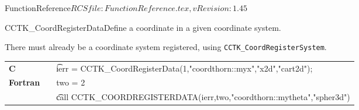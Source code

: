 \begin{cactuspart}{5}{FunctionReference}{$RCSfile: FunctionReference.tex,v $}{$Revision: 1.45 $}
\begin{CCTKFunc}{CCTK\_CoordRegisterData}{Define a coordinate in a given coordinate
system.}
\label{CCTK-CoordRegisterData}
\showargs
\begin{params}
\end{params}
\begin{discussion}
There must already be a coordinate system registered,
using {\tt CCTK\_CoordRegisterSystem}.
\end{discussion}
\begin{examples}
\begin{tabular}{@{}p{3cm}cp{11cm}}
\hfill {\bf C} && {\t ierr = CCTK\_CoordRegisterData(1,"coordthorn::myx","x2d","cart2d")};
\\
\hfill {\bf Fortran} && two = 2
\\
&&{\t call CCTK\_COORDREGISTERDATA(ierr,two,"coordthorn::mytheta","spher3d")}
\\
\end{tabular}
\end{examples}
\begin{errorcodes}
\end{errorcodes}
\end{CCTKFunc}


\end{cactuspart}
